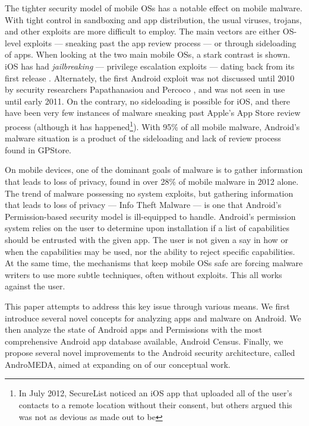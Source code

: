 \documentclass{acm_proc_article-sp}
\begin{document}
The tighter security model of mobile OSs has a notable effect on mobile malware. With tight control in sandboxing and app distribution, the usual viruses, trojans, and other exploits are more difficult to employ. The main vectors are either OS-level exploits --- sneaking past the app review process --- or through sideloading of apps. When looking at the two main mobile OSs, a stark contrast is shown. iOS has had  \textit{jailbreaking} --- privilege escalation exploits --- dating back from its first release \citep{damopoulos2011isam}. Alternately, the first Android exploit was not discussed until 2010 by security researchers Papathanasiou and Percoco \citep{papathanasiou2010not}, and was not seen in use until early 2011\citep{castillo2010android}. On the contrary, no sideloading is possible for iOS, and there have been very few instances of malware sneaking past Apple's App Store review process (although it has happened\footnote{In July 2012, SecureList noticed an iOS app that uploaded all of the user's contacts to a remote location without their consent\citep{SecureList2012}, but others argued this was not as devious as made out to be\citep{trendmicroios2012} }). With 95\% of all mobile malware\citep{nq2013}, Android's malware situation is a product of the sideloading and lack of review process found in GPStore\citep{nq2013}. %

 On mobile devices, one of the dominant goals of malware is to gather information that leads to loss of privacy, found in over 28\% of mobile malware in 2012 alone\citep{nq2013}. The trend of malware possessing no system exploits, but gathering information that leads to loss of privacy --- Info Theft Malware --- is one that Android's Permission-based security model is ill-equipped to handle. Android's permission system relies on the user to determine upon installation if a list of capabilities should be entrusted with the given app. The user is not given a say in how or when the capabilities may be used, nor the ability to reject specific capabilities. At the same time, the mechanisms that keep mobile OSs safe are forcing malware writers to use more subtle techniques, often without exploits. This all works against the user.

This paper attempts to address this key issue through various means. We first introduce several novel concepts for analyzing apps and malware on Android. We then analyze the state of Android apps and Permissions with the most comprehensive Android app database available, Android Census. Finally, we propose several novel improvements to the Android security architecture, called AndroMEDA, aimed at expanding on of our conceptual work.
\end{document}
